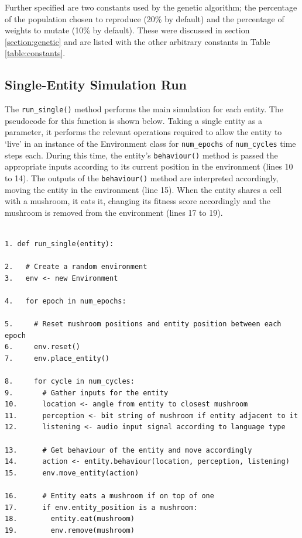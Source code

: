 \documentclass[12pt,a4paper,twoside,openright]{report}
\begin{document}
Further specified are two constants used by the genetic algorithm; the percentage of the population chosen to reproduce (20\% by default) and the percentage of weights to mutate (10\% by default). These were discussed in section \ref{section:genetic} and are listed with the other arbitrary constants in Table \ref{table:constants}.

\subsection{Single-Entity Simulation Run}\label{section:single-implementation}

The \texttt{run\_single()} method performs the main simulation for each entity. The pseudocode for this function is shown below. Taking a single entity as a parameter, it performs the relevant operations required to allow the entity to `live' in an instance of the Environment class for \texttt{num\_epochs} of \texttt{num\_cycles} time steps each. During this time, the entity's \texttt{behaviour()} method is passed the appropriate inputs according to its current position in the environment (lines 10 to 14). The outputs of the \texttt{behaviour()} method are interpreted accordingly, moving the entity in the environment (line 15). When the entity shares a cell with a mushroom, it eats it, changing its fitness score accordingly and the mushroom is removed from the environment (lines 17 to 19).

\begin{verbatim}

1. def run_single(entity):

2.   # Create a random environment
3.   env <- new Environment
  
4.   for epoch in num_epochs:

5.     # Reset mushroom positions and entity position between each epoch
6.     env.reset()
7.     env.place_entity()
  
8.     for cycle in num_cycles:
9.       # Gather inputs for the entity
10.      location <- angle from entity to closest mushroom
11.      perception <- bit string of mushroom if entity adjacent to it
12.      listening <- audio input signal according to language type
    
13.      # Get behaviour of the entity and move accordingly
14.      action <- entity.behaviour(location, perception, listening)
15.      env.move_entity(action)
      
16.      # Entity eats a mushroom if on top of one
17.      if env.entity_position is a mushroom:
18.        entity.eat(mushroom)
19.        env.remove(mushroom)

\end{verbatim}
\end{document}
